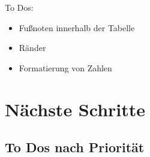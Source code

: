 \documentclass[
  a4paper,
  twoside]{article}
\providecommand{\tightlist}{%
  \setlength{\itemsep}{0pt}\setlength{\parskip}{0pt}}
\begin{document}
To Dos:

\begin{itemize}
\tightlist
\item
  Fußnoten innerhalb der Tabelle
\item
  Ränder
\item
  Formatierung von Zahlen
\end{itemize}

\newpage

\hypertarget{nuxe4chste-schritte}{%
\section{Nächste Schritte}\label{nuxe4chste-schritte}}

\hypertarget{to-dos-nach-priorituxe4t}{%
\subsection{To Dos nach Priorität}\label{to-dos-nach-priorituxe4t}}
\end{document}
